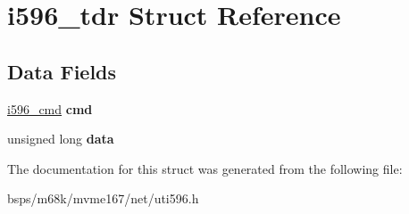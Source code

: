\hypertarget{structi596__tdr}{}\section{i596\+\_\+tdr Struct Reference}
\label{structi596__tdr}
\subsection*{Data Fields}
\begin{DoxyCompactItemize}
\item 
\mbox{\label{structi596__tdr_a1aa01f1752ae28c6d85edba3e10c7cbb}} 
\mbox{\hyperlink{structi596__cmd}{i596\+\_\+cmd}} {\bfseries cmd}
\item 
\mbox{\label{structi596__tdr_ac2df1408f6f4fc2eea67d2dc38b9ccbb}} 
unsigned long {\bfseries data}
\end{DoxyCompactItemize}


The documentation for this struct was generated from the following file\+:\begin{DoxyCompactItemize}
\item 
bsps/m68k/mvme167/net/uti596.\+h\end{DoxyCompactItemize}
